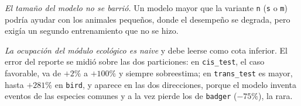 \emph{El tamaño del modelo no se barrió.} Un modelo mayor que la variante
\texttt{n} (\texttt{s} o \texttt{m}) podría ayudar con los animales pequeños,
donde el desempeño se degrada, pero exigía un segundo entrenamiento que no se
hizo.

\emph{La ocupación del módulo ecológico es naive} y debe leerse como cota
inferior. El error del reporte se midió sobre las dos particiones: en
\texttt{cis\_test}, el caso favorable, va de $+2\%$ a $+100\%$ y siempre
sobreestima; en \texttt{trans\_test} es mayor, hasta $+281\%$ en \texttt{bird}, y
aparece en las dos direcciones, porque el modelo inventa eventos de las especies
comunes y a la vez pierde los de \texttt{badger} ($-75\%$), la rara.
